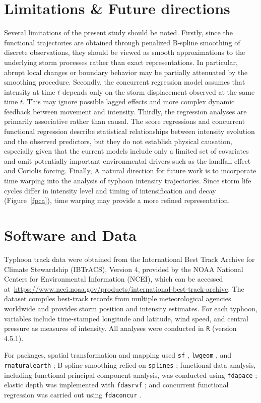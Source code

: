 \documentclass{article}
\begin{document}
\section{Limitations \& Future directions}

Several limitations of the present study should be noted. Firstly, since the functional trajectories are obtained through penalized B-spline smoothing of discrete observations, they should be viewed as smooth approximations to the underlying storm processes rather than exact representations. In particular, abrupt local changes or boundary behavior may be partially attenuated by the smoothing procedure. Secondly, the concurrent regression model assumes that intensity at time $t$ depends only on the storm displacement observed at the same time $t$. This may ignore possible lagged effects and more complex dynamic feedback between movement and intensity. Thirdly, the regression analyses are primarily associative rather than causal. The score regressions and concurrent functional regression describe statistical relationships between intensity evolution and the observed predictors, but they do not establish physical causation, especially given that the current models include only a limited set of covariates and omit potentially important environmental drivers such as the landfall effect and Coriolis forcing. Finally, A natural direction for future work is to incorporate time warping into the analysis of typhoon intensity trajectories. Since storm life cycles differ in intensity level and timing of intensification and decay (Figure~\ref{fpca}), time warping may provide a more refined representation.


\section*{Software and Data}
Typhoon track data were obtained from the International Best Track Archive for Climate Stewardship (IBTrACS), Version 4, provided by the NOAA National Centers for Environmental Information (NCEI), which can be accessed at~\url{https://www.ncei.noaa.gov/products/international-best-track-archive}. The dataset compiles best-track records from multiple meteorological agencies worldwide and provides storm position and intensity estimates. For each typhoon, variables include time-stamped longitude and latitude, wind speed, and central pressure as measures of intensity. All analyses were conducted in \texttt{R} (version 4.5.1).

For packages, spatial transformation and mapping used \texttt{sf} \cite{Pebesma2018sf}, \texttt{lwgeom} \cite{Pebesma2026lwgeom}, and \texttt{rnaturalearth} \cite{Massicotte2026rnaturalearth}; B-spline smoothing relied on \texttt{splines} \cite{Hastie1992gam}; functional data analysis, including functional principal component analysis, was conducted using \texttt{fdapace} \cite{Zhou2024fdapace,Wang2016FDA}; elastic depth was implemented with \texttt{fdasrvf} \cite{Tucker2026fdasrvf,Tucker2013generative}; and concurrent functional regression was carried out using \texttt{fdaconcur} \cite{Iao2024fdaconcur,Senturk2010functional}.
\end{document}
